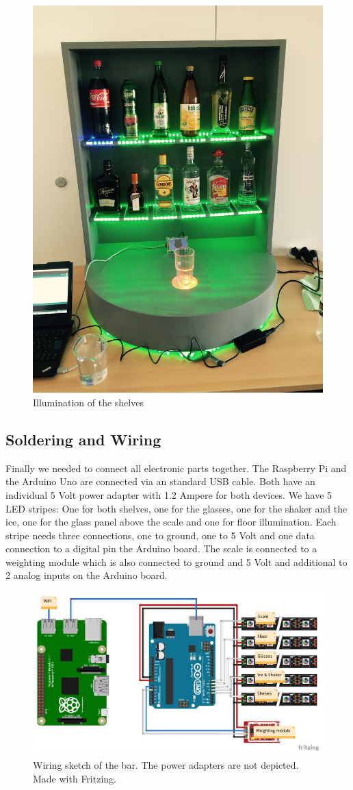 \documentclass{acm_proc_article-sp}
\begin{document}
\begin{figure}[htbp] 
  \centering
     \includegraphics[width=0.5\linewidth]{pictures/illuminated_shelves.jpg}
  \caption{Illumination of the shelves}
  \label{fig:illuminated_shelves}
\end{figure}


\subsection{Soldering and Wiring}
Finally we needed to connect all electronic parts together. The Raspberry Pi and the Arduino Uno are connected via an standard USB cable. Both have an individual 5 Volt power adapter with 1.2 Ampere for both devices. We have 5 LED stripes: One for both shelves, one for the glasses, one for the shaker and the ice, one for the glass panel above the scale and one for floor illumination. Each stripe needs three connections, one to ground, one to 5 Volt and one data connection to a digital pin the Arduino board. The scale is connected to a weighting module which is also connected to ground and 5 Volt and additional to 2 analog inputs on the Arduino board.

\begin{figure}[htbp] 
  \centering
     \includegraphics[width=1\linewidth]{pictures/sketch.pdf}
  \caption{Wiring sketch of the bar. The power adapters are not depicted. Made with Fritzing.}
  \label{fig:fritzing}
\end{figure}
\end{document}
